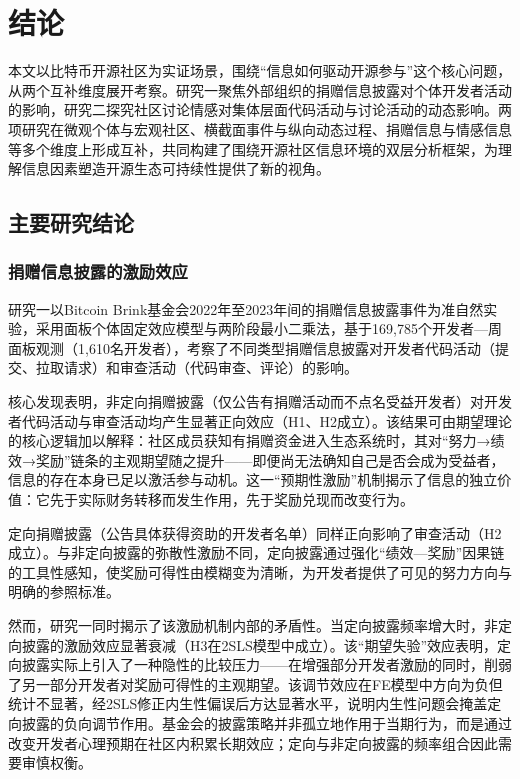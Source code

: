 \chapter{结论}

本文以比特币开源社区为实证场景，围绕“信息如何驱动开源参与”这个核心问题，从两个互补维度展开考察。研究一聚焦外部组织的捐赠信息披露对个体开发者活动的影响，研究二探究社区讨论情感对集体层面代码活动与讨论活动的动态影响。两项研究在微观个体与宏观社区、横截面事件与纵向动态过程、捐赠信息与情感信息等多个维度上形成互补，共同构建了围绕开源社区信息环境的双层分析框架，为理解信息因素塑造开源生态可持续性提供了新的视角。

\section{主要研究结论}

\subsection{捐赠信息披露的激励效应}

研究一以Bitcoin Brink基金会2022年至2023年间的捐赠信息披露事件为准自然实验，采用面板个体固定效应模型与两阶段最小二乘法，基于169,785个开发者—周面板观测（1,610名开发者），考察了不同类型捐赠信息披露对开发者代码活动（提交、拉取请求）和审查活动（代码审查、评论）的影响。

核心发现表明，非定向捐赠披露（仅公告有捐赠活动而不点名受益开发者）对开发者代码活动与审查活动均产生显著正向效应（H1、H2成立）。该结果可由期望理论的核心逻辑加以解释：社区成员获知有捐赠资金进入生态系统时，其对“努力→绩效→奖励”链条的主观期望随之提升——即便尚无法确知自己是否会成为受益者，信息的存在本身已足以激活参与动机。这一“预期性激励”机制揭示了信息的独立价值：它先于实际财务转移而发生作用，先于奖励兑现而改变行为。

定向捐赠披露（公告具体获得资助的开发者名单）同样正向影响了审查活动（H2成立）。与非定向披露的弥散性激励不同，定向披露通过强化“绩效—奖励”因果链的工具性感知，使奖励可得性由模糊变为清晰，为开发者提供了可见的努力方向与明确的参照标准。

然而，研究一同时揭示了该激励机制内部的矛盾性。当定向披露频率增大时，非定向披露的激励效应显著衰减（H3在2SLS模型中成立）。该“期望失验”效应表明，定向披露实际上引入了一种隐性的比较压力——在增强部分开发者激励的同时，削弱了另一部分开发者对奖励可得性的主观期望。该调节效应在FE模型中方向为负但统计不显著，经2SLS修正内生性偏误后方达显著水平，说明内生性问题会掩盖定向披露的负向调节作用。基金会的披露策略并非孤立地作用于当期行为，而是通过改变开发者心理预期在社区内积累长期效应；定向与非定向披露的频率组合因此需要审慎权衡。

